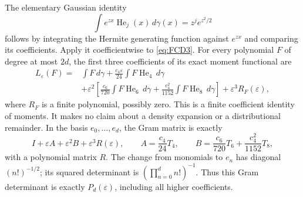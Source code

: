 \documentclass[11pt]{article}
\begin{document}
The elementary Gaussian identity
\[
 \int e^{zx}\operatorname{He}_j(x)\,d\gamma(x)
       =z^j e^{z^2/2}
\]
follows by integrating the Hermite generating function against \(e^{zx}\)
and comparing its coefficients. Apply it coefficientwise to
\eqref{eq:FCD3}. For every polynomial \(F\) of degree at most \(2d\),
the first three coefficients of its exact moment functional are
\[
 \begin{split}
 L_\varepsilon(F)
 ={}&\int F\,d\gamma
       +\frac{c_4\varepsilon}{24}
                       \int F\operatorname{He}_4\,d\gamma\\
   &+\varepsilon^2\left[
        \frac{c_6}{720}\int F\operatorname{He}_6\,d\gamma
       +\frac{c_4^2}{1152}\int F\operatorname{He}_8\,d\gamma
                         \right]+\varepsilon^3 R_F(\varepsilon),
 \end{split}
\]
where \(R_F\) is a finite polynomial, possibly zero. This is a
finite coefficient identity of moments. It makes no claim about a
density expansion or a distributional remainder.
In the basis \(e_0,\ldots,e_d\), the Gram matrix is exactly
\[
 I+\varepsilon A+\varepsilon^2 B+\varepsilon^3 R(\varepsilon),
 \qquad
 A=\frac{c_4}{24}T_4,\qquad
 B=\frac{c_6}{720}T_6+\frac{c_4^2}{1152}T_8,
\]
with a polynomial matrix \(R\).
The change from monomials to \(e_n\) has diagonal
\((n!)^{-1/2}\); its squared determinant is
\((\prod_{n=0}^d n!)^{-1}\). Thus this Gram determinant is exactly
\(P_d(\varepsilon)\), including all higher coefficients.
\end{document}
